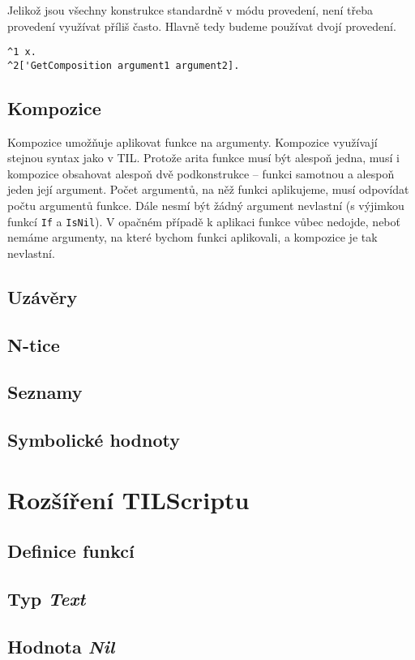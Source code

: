 Jelikož jsou všechny konstrukce standardně v módu provedení, není třeba provedení využívat příliš
často. Hlavně tedy budeme používat dvojí provedení.

\begin{lstlisting}[caption={Příklad využití provedení}]
^1 x.
^2['GetComposition argument1 argument2].
\end{lstlisting}

\subsection{Kompozice}

Kompozice umožňuje aplikovat funkce na argumenty. Kompozice využívají stejnou syntax jako v TIL.
Protože arita funkce musí být alespoň jedna, musí i kompozice obsahovat alespoň dvě podkonstrukce
-- funkci samotnou a alespoň jeden její argument. Počet argumentů, na něž funkci aplikujeme, musí
odpovídat počtu argumentů funkce. Dále nesmí být žádný argument nevlastní (s výjimkou funkcí
\lstinline{If} a \lstinline{IsNil}). V opačném případě k aplikaci funkce vůbec nedojde, neboť
nemáme argumenty, na které bychom funkci aplikovali, a kompozice je tak nevlastní.

\subsection{Uzávěry}

\subsection{N-tice}

\subsection{Seznamy}

\subsection{Symbolické hodnoty} \label{symbolic-values}

\section{Rozšíření TILScriptu}

\subsection{Definice funkcí} \label{fn-definition}

\subsection{Typ \textit{Text}} \label{text-type}

\subsection{Hodnota \textit{Nil}} \label{nil-value}

\endinput
